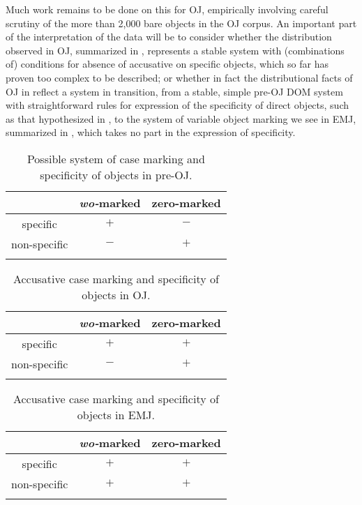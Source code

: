 \documentclass[output=paper]{LSP/langsci}
\begin{document}
Much work remains to be done on this for OJ, empirically involving careful scrutiny of the more than 2,000 bare objects in the OJ corpus. An important part of the interpretation of the data will be to consider whether the distribution observed in OJ, summarized in , represents a stable system with (combinations of) conditions for absence of accusative  on specific objects, which so far has proven too complex to be described; or whether in fact the distributional facts of OJ in  reflect a system in transition, from a stable, simple pre-OJ DOM system with straightforward rules for expression of the specificity of direct objects, such as that hypothesized in , to the system of variable object marking we see in EMJ, summarized in , which takes no part in the expression of specificity.

\begin{table}
	\caption{Possible system of case marking and specificity of objects in pre-OJ.}
	\begin{tabular}{ccc}
\lsptoprule
 & \textit{wo-}marked & zero-marked\\\midrule
 specific & $+$ & $-$\\
 non-specific & $-$ & $+$\\
\lspbottomrule
	\end{tabular}
	\label{07-fr-tab:3}
\end{table}

\begin{table}
	\caption{Accusative case marking and specificity of objects in OJ.}
	\begin{tabular}{ ccc }
\lsptoprule
 & \textit{wo-}marked & zero-marked\\\midrule
 specific & $+$ & $+$\\
 non-specific & $-$ & $+$\\
\lspbottomrule
	\end{tabular}
	\label{07-fr-tab:4}
\end{table}

\begin{table}
	\caption{Accusative case marking and specificity of objects in EMJ.}
	\begin{tabular}{ ccc }
\lsptoprule
 & \textit{wo-}marked & zero-marked\\\midrule
 specific & $+$ & $+$\\
 non-specific & $+$ & $+$\\
\lspbottomrule
	\end{tabular}
	\label{07-fr-tab:5}
\end{table}
\end{document}
